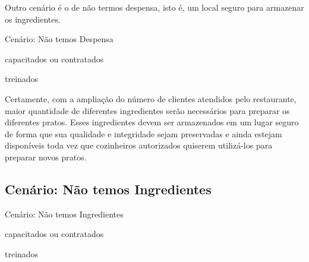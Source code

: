     Outro cenário é o de não termos despensa, isto é, um local seguro para armazenar os ingredientes.

    \begin{env-cenario2}{Cenário: Não temos Despensa}
            \mschecksim \xspace \CLIENTE 
            
            \mschecksim \xspace \CARDAPIO  

            \mschecksim \xspace \LIVRODERECEITAS
            
            \mschecksim \xspace \FOGAO

            \mschecksim \xspace \COZINHEIROS \xspace capacitados ou contratados
        
            \mschecksim \xspace \GERENTES \xspace treinados

            \mschecknao \xspace \DESPENSA
    \end{env-cenario2}

    Certamente, com a ampliação do número de clientes atendidos pelo restaurante, maior quantidade de diferentes ingredientes serão necessários para preparar os diferentes pratos. Esses ingredientes devem ser armazenados em um lugar seguro de forma que sua qualidade e integridade sejam preservadas e ainda estejam disponíveis toda vez que cozinheiros autorizados quiserem utilizá-los para preparar novos pratos. 

\subsection{Cenário: Não temos Ingredientes}
\label{sub-cenario-naotemosingredientes}

    \begin{env-cenario2}{Cenário: Não temos Ingredientes}
            \mschecksim \xspace \CLIENTE 
            
            \mschecksim \xspace \CARDAPIO  

            \mschecksim \xspace \LIVRODERECEITAS
            
            \mschecksim \xspace \FOGAO

            \mschecksim \xspace \COZINHEIROS \xspace capacitados ou contratados
        
            \mschecksim \xspace \GERENTES \xspace treinados

            \mschecksim \xspace \DESPENSA

            \mschecknao \xspace \INGREDIENTES
    \end{env-cenario2}

